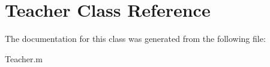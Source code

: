 \hypertarget{class_teacher}{\section{Teacher Class Reference}
\label{class_teacher}
}


The documentation for this class was generated from the following file\+:\begin{DoxyCompactItemize}
\item 
Teacher.\+m\end{DoxyCompactItemize}
